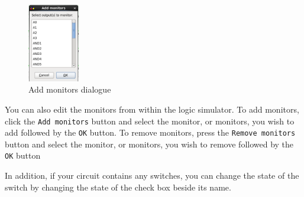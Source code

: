 \documentclass[a4paper,10pt]{article}
\begin{document}
\begin{figure}
  \begin{center}
    \includegraphics[width=0.2\textwidth]{monitors}
  \end{center}
  \caption{Add monitors dialogue}
\end{figure}

You can also edit the monitors from within the logic simulator. To add monitors, click the \texttt{Add monitors} button and select the monitor, or monitors, you wish to add followed by the \texttt{OK} button. To remove monitors, press the \texttt{Remove monitors} button and select the monitor, or monitors, you wish to remove followed by the \texttt{OK} button

In addition, if your circuit contains any  switches, you can change the state of the switch by changing the state of the check box beside its name.
\end{document}
